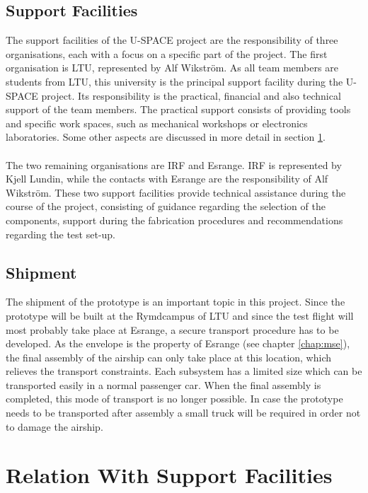 \subsection{Support Facilities}

The support facilities of the \ac{U-SPACE} project are the responsibility of three organisations, each with a focus on a specific part of the project. The first organisation is \ac{LTU}, represented by Alf Wikström. As all team members are students from \ac{LTU}, this university is the principal support facility during the \ac{U-SPACE} project. Its responsibility is the practical, financial and also technical support of the team members. The practical support consists of providing tools and specific work spaces, such as mechanical workshops or electronics laboratories. Some other aspects are discussed in more detail in section \ref{sec:relation_support}.
\\
\\
The two remaining organisations are \ac{IRF} and Esrange. \ac{IRF} is represented by Kjell Lundin, while the contacts with Esrange are the responsibility of Alf Wikström. These two support facilities provide technical assistance during the course of the project, consisting of guidance regarding the selection of the components, support during the fabrication procedures and recommendations regarding the test set-up.

\subsection{Shipment}

The shipment of the prototype is an important topic in this project. Since the prototype will be built at the Rymdcampus of \ac{LTU} and since the test flight will most probably take place at Esrange, a secure transport procedure has to be developed. As the envelope is the property of Esrange (see chapter \ref{chap:mse}), the final assembly of the airship can only take place at this location, which relieves the transport constraints. Each subsystem has a limited size which can be  transported easily in a normal passenger car. When the final assembly is completed, this mode of transport is no longer possible. In case the prototype needs to be transported after assembly a small truck will be required in order not to damage the airship.

\section{Relation With Support Facilities}
\label{sec:relation_support}

